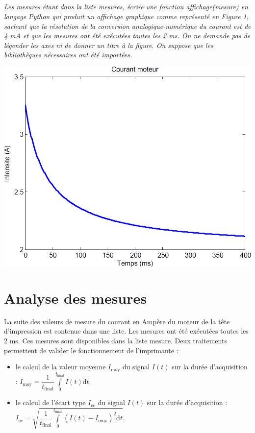\documentclass[10pt]{article}
\newif\ifprof
\begin{document}
\else
\fi


\subparagraph{}
\textit{Les mesures étant dans la liste mesures, écrire une fonction affichage(mesure) en langage Python qui produit un affichage graphique comme représenté en Figure 1, sachant que la résolution de la conversion analogique-numérique du courant est de 4 mA et que les mesures ont été exécutées toutes les 2 ms. On ne demande pas de légender les axes ni de donner un titre
à la figure. On suppose que les bibliothèques nécessaires ont été importées.}
\ifprof
\begin{corrige}
\begin{python}
Temps,Intensite =[],[]
tps=0
for i in range(mesures):
    Temps.append(tps)
    Intensite.append(mesures[i]*0.004)
    tps = tps+0.002
plt.plot(Temps,Intensite)
plt.show()
\end{python}
\end{corrige}

\else
\fi


\begin{center}
\includegraphics[width=.6\textwidth]{images/fig_03}
\end{center}


\section{Analyse des mesures}

La suite des valeurs de mesure du courant en Ampère du moteur de la tête d'impression
est contenue dans une liste. Les mesures ont été exécutées toutes les 2 ms. Ces mesures sont
disponibles dans la liste mesure. Deux traitements permettent de valider le fonctionnement de
l'imprimante :
\begin{itemize}
\item le calcul de la valeur moyenne $I_{\text{moy}}$ du signal $I(t)$ sur la durée d'acquisition : $I_{\text{moy}} = \dfrac{1}{t_\text{final}} \int\limits_0^{t_\text{final}} I(t) \text{d}t $;
\item le calcul de l'écart type $I_{\text{ec}}$ du signal $I(t)$ sur la durée d'acquisition : $I_{\text{ec}} = 
\sqrt{\dfrac{1}{t_\text{final}} \int\limits_0^{t_\text{final}} \left(I(t) -I_{\text{moy}}\right)^2\text{d}t }$.
\end{itemize}
\end{document}
